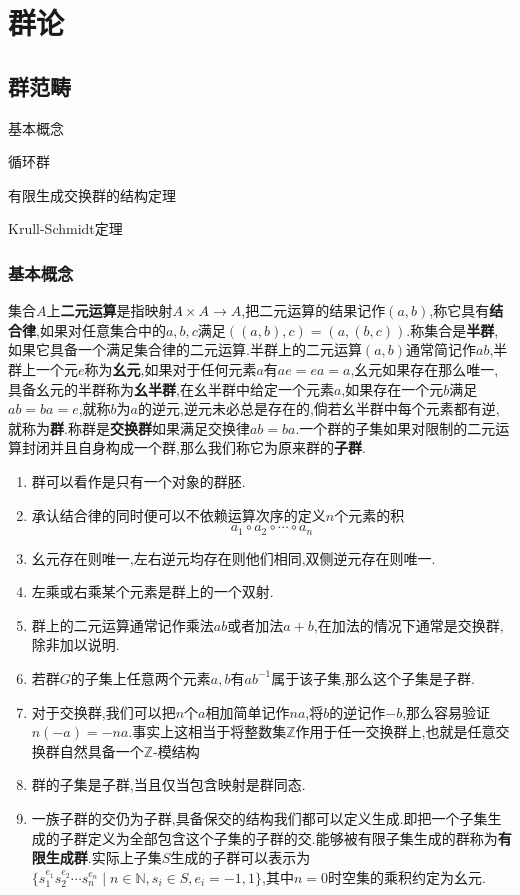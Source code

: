 \chapter{群论}
\section{群范畴}

\begin{introduction}
	\item 基本概念
	\item 循环群
	\item 有限生成交换群的结构定理
	\item Krull-Schmidt定理
\end{introduction}

\subsection{基本概念}

集合$A$上\textbf{二元运算}是指映射$A\times A\to A$,把二元运算的结果记作$(a,b)$,称它具有\textbf{结合律},如果对任意集合中的$a,b,c$满足$((a,b),c)=(a,(b,c))$.称集合是\textbf{半群},如果它具备一个满足集合律的二元运算.半群上的二元运算$(a,b)$通常简记作$ab$,半群上一个元$e$称为\textbf{幺元},如果对于任何元素$a$有$ae=ea=a$,幺元如果存在那么唯一,具备幺元的半群称为\textbf{幺半群},在幺半群中给定一个元素$a$,如果存在一个元$b$满足$ab=ba=e$,就称$b$为$a$的逆元,逆元未必总是存在的,倘若幺半群中每个元素都有逆,就称为\textbf{群}.称群是\textbf{交换群}如果满足交换律$ab=ba$.一个群的子集如果对限制的二元运算封闭并且自身构成一个群,那么我们称它为原来群的\textbf{子群}.

\begin{enumerate}
	\item 群可以看作是只有一个对象的群胚.
	\item 承认结合律的同时便可以不依赖运算次序的定义$n$个元素的积
	$$a_1\circ a_2\circ\cdots\circ a_n$$
	\item 幺元存在则唯一,左右逆元均存在则他们相同,双侧逆元存在则唯一.
	\item 左乘或右乘某个元素是群上的一个双射.
	\item 群上的二元运算通常记作乘法$ab$或者加法$a+b$,在加法的情况下通常是交换群,除非加以说明.
	\item 若群$G$的子集上任意两个元素$a,b$有$ab^{-1}$属于该子集,那么这个子集是子群.
	\item 对于交换群,我们可以把$n$个$a$相加简单记作$na$,将$b$的逆记作$-b$,那么容易验证$n(-a)=-na$.事实上这相当于将整数集$\mathbb{Z}$作用于任一交换群上,也就是任意交换群自然具备一个$\mathbb{Z}$-模结构
	\item 群的子集是子群,当且仅当包含映射是群同态.
	\item 一族子群的交仍为子群,具备保交的结构我们都可以定义生成.即把一个子集生成的子群定义为全部包含这个子集的子群的交.能够被有限子集生成的群称为\textbf{有限生成群}.实际上子集$S$生成的子群可以表示为$\{s_1^{e_1}s_2^{e_2}\cdots s_n^{e_n}\mid n\in\mathbb{N},s_i\in S,e_i=-1,1\}$,其中$n=0$时空集的乘积约定为幺元.
\end{enumerate}

